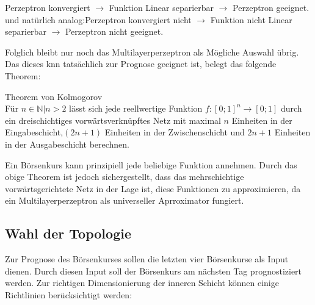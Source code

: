 Perzeptron konvergiert $\rightarrow$ Funktion Linear separierbar $\rightarrow$ Perzeptron geeignet.
und natürlich analog:Perzeptron konvergiert nicht $\rightarrow$ Funktion nicht Linear separierbar $\rightarrow$ Perzeptron nicht geeignet.

Folglich bleibt nur noch das Multilayerperzeptron als Mögliche Auswahl übrig. Das dieses \ac{knn} tatsächlich zur Prognose geeignet ist, belegt das folgende Theorem:

\begin{theo}Theorem von Kolmogorov\\
Für ${n \in \mathbb{N} | n>2}$ lässt sich jede reellwertige Funktion $f:[0;1]^n\rightarrow[0;1]$ durch ein dreischichtiges vorwärtsverknüpftes Netz mit maximal $n$ Einheiten in der Eingabeschicht,$(2n+1)$ Einheiten in der Zwischenschicht und $2n+1$ Einheiten in der Ausgabeschicht berechnen.
\end{theo}

Ein Börsenkurs kann prinzipiell jede beliebige Funktion annehmen. Durch das obige Theorem ist jedoch sichergestellt, dass das mehrschichtige vorwärtsgerichtete Netz in der Lage ist, diese Funktionen zu approximieren, da ein Multilayerperzeptron als universeller Aprroximator fungiert.

\subsection{Wahl der Topologie}
\label{subsection:Wahl der Topologie}

Zur Prognose des Börsenkurses sollen die letzten vier Börsenkurse als Input dienen. Durch diesen Input soll der Börsenkurs am nächsten Tag prognostiziert werden. Zur richtigen Dimensionierung der inneren Schicht können einige Richtlinien berücksichtigt werden:

